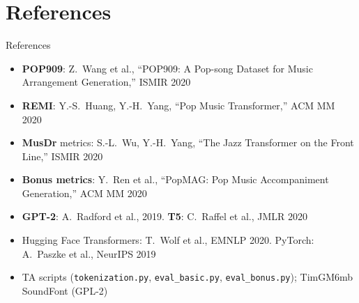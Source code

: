 \documentclass[aspectratio=169,11pt]{beamer}
\newenvironment{tight}{\begin{itemize}\setlength{\itemsep}{1.5pt}\setlength{\parskip}{0pt}\setlength{\topsep}{0pt}}{\end{itemize}}
\begin{document}
\section{References}
\begin{frame}[t]{References}
  \footnotesize
  \begin{tight}\footnotesize
    \item \textbf{POP909}: Z.~Wang et al., ``POP909: A Pop-song Dataset for Music Arrangement Generation,'' ISMIR 2020
    \item \textbf{REMI}: Y.-S.~Huang, Y.-H.~Yang, ``Pop Music Transformer,'' ACM MM 2020
    \item \textbf{MusDr} metrics: S.-L.~Wu, Y.-H.~Yang, ``The Jazz Transformer on the Front Line,'' ISMIR 2020
    \item \textbf{Bonus metrics}: Y.~Ren et al., ``PopMAG: Pop Music Accompaniment Generation,'' ACM MM 2020
    \item \textbf{GPT-2}: A.~Radford et al., 2019. \quad \textbf{T5}: C.~Raffel et al., JMLR 2020
    \item Hugging Face Transformers: T.~Wolf et al., EMNLP 2020. \quad PyTorch: A.~Paszke et al., NeurIPS 2019
    \item TA scripts (\texttt{tokenization.py}, \texttt{eval\_basic.py}, \texttt{eval\_bonus.py}); TimGM6mb SoundFont (GPL-2)
  \end{tight}
\end{frame}
\end{document}
